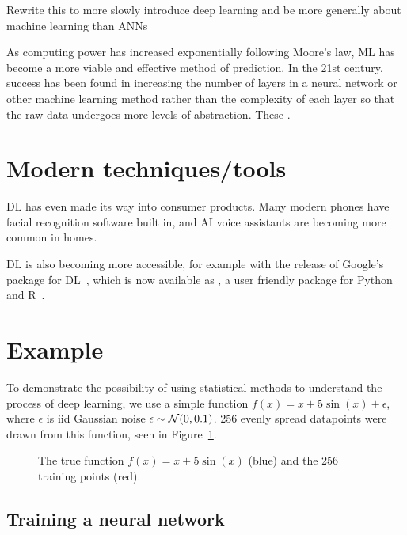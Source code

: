 \begin{todo}
	Rewrite this to more slowly introduce deep learning and be more generally about machine learning than ANNs
\end{todo}

As computing power has increased exponentially following Moore's law, \ac{ML} has become a more viable and effective method of prediction.
In the 21st century, success has been found in increasing the number of layers in a neural network or other machine learning method rather than the complexity of each layer so that the raw data undergoes more levels of abstraction.
These  .

\section{Modern techniques/tools}

\ac{DL} has even made its way into consumer products.
Many modern phones have facial recognition software built in, and \ac{AI} voice assistants are becoming more common in homes.

\ac{DL} is also becoming more accessible, for example with the release of Google's  package for \ac{DL}~\autocite{abadi2016}, which is now available as , a user friendly package for Python~\autocite{chollet2015} and R~\autocite{allaire2018}.

\section{Example}

To demonstrate the possibility of using statistical methods to understand the process of deep learning, we use a simple function \(f(x) = x + 5 \sin(x) + \epsilon\), where \(\epsilon\) is iid Gaussian noise \(\epsilon \sim \mathcal{N}(0, 0.1)\).
256 evenly spread datapoints were drawn from this function, seen in Figure~\ref{fig:sin-x-dataset}.

\begin{figure}[htbp]
	\centering
	
	\caption{The true function \(f(x) = x + 5 \sin(x)\) (blue) and the 256 training points (red).}
	\label{fig:sin-x-dataset}
\end{figure}

\subsection{Training a neural network}

